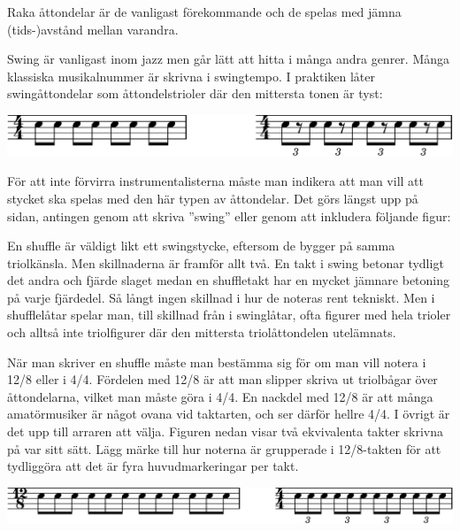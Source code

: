 Raka åttondelar är de vanligast förekommande och de spelas med jämna (tids-)avstånd mellan varandra.

Swing är vanligast inom jazz men går lätt att hitta i många andra genrer. Många klassiska musikalnummer är skrivna i swingtempo. I praktiken låter swingåttondelar som åttondelstrioler där den mittersta tonen är tyst:

\begin{center}
\includegraphics{lilypond/swing.cropped.png}
\end{center}

För att inte förvirra instrumentalisterna måste man indikera att man vill att stycket ska spelas med den här typen av åttondelar. Det görs längst upp på sidan, antingen genom att skriva ”swing” eller genom att inkludera följande figur: 


En shuffle är väldigt likt ett swingstycke, eftersom de bygger på samma triolkänsla. Men skillnaderna är framför allt två. En takt i swing betonar tydligt det andra och fjärde slaget medan en shuffletakt har en mycket jämnare betoning på varje fjärdedel. Så långt ingen skillnad i hur de noteras rent tekniskt. Men i shufflelåtar spelar man, till skillnad från i swinglåtar, ofta figurer med hela trioler och alltså inte triolfigurer där den mittersta triolåttondelen utelämnats.

När man skriver en shuffle måste man bestämma sig för om man vill notera i 12/8 eller i 4/4. Fördelen med 12/8 är att man slipper skriva ut triolbågar över åttondelarna, vilket man måste göra i 4/4. En nackdel med 12/8 är att många amatörmusiker är något ovana vid taktarten, och ser därför hellre 4/4. I övrigt är det upp till arraren att välja. Figuren nedan visar två ekvivalenta takter skrivna på var sitt sätt. Lägg märke till hur noterna är grupperade i 12/8-takten för att tydliggöra att det är fyra huvudmarkeringar per takt. 

\begin{center}
\includegraphics{lilypond/shuffle.cropped.png}
\end{center}

